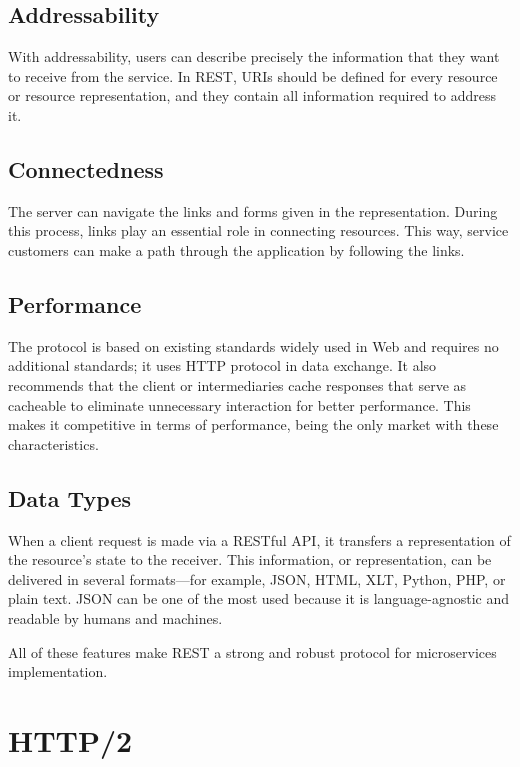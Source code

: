 \documentclass[conference]{IEEEtran}
\begin{document}
\subsection{Addressability}

With addressability, users can describe precisely the information that they want to receive from the service. In REST, URIs should be defined for every resource or resource representation, and they contain all information required to address it.

\subsection{Connectedness}

The server can navigate the links and forms given in the representation. During this process, links play an essential role in connecting resources. This way, service customers can make a path through the application by following the links.

\subsection{Performance}

The protocol is based on existing standards widely used in Web and requires no additional standards; it uses HTTP protocol in data exchange. It also recommends that the client or intermediaries cache responses that serve as cacheable to eliminate unnecessary interaction for better performance. This makes it competitive in terms of performance, being the only market with these characteristics.

\subsection{Data Types}

When a client request is made via a RESTful API, it transfers a representation of the resource's state to the receiver. This information, or representation, can be delivered in several formats—for example, JSON, HTML, XLT, Python, PHP, or plain text. 
JSON can be one of the most used because it is language-agnostic and readable by humans and machines.\cite{REST-red-hat}

All of these features make REST a strong and robust protocol for microservices implementation.

\section{HTTP/2}
\end{document}
